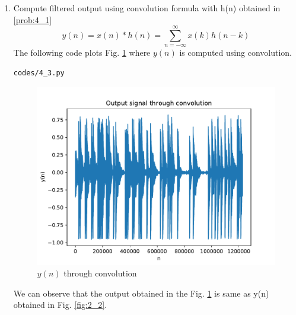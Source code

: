 \documentclass[journal,12pt,twocolumn]{IEEEtran}
\renewcommand\thesection{\arabic{section}}
\begin{document}
\begin{enumerate}[label=\thesection.\arabic*,ref=\thesection.\theenumi]
\\
\item Compute filtered output using convolution formula with h(n) obtained in \ref{prob:4_1}
%
\begin{equation}
\label{eq:4_3}
y(n) = x(n)*h(n) = \sum_{n=-\infty}^{\infty}x(k)h(n-k)
\end{equation}
\solution The following code plots Fig. \ref{fig:4_3} where $y(n)$ is computed using convolution.
%
\begin{lstlisting}
codes/4_3.py
\end{lstlisting}
\begin{figure}[!ht]
\centering
\includegraphics[width=\columnwidth]{./figs/4_3}
\caption{$y(n)$ through convolution}
\label{fig:4_3}
\end{figure}
We can observe that the output obtained in the Fig. \ref{fig:4_3} is same as y(n) obtained in Fig. \ref{fig:2_2}.

\end{enumerate}
\end{document}

